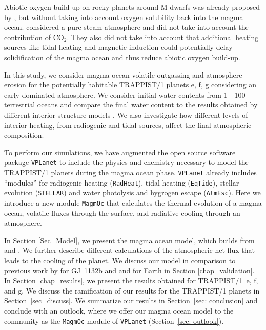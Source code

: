 \documentclass[paper=letterpaper,fontsize=12pt,oneside,twocolumn]{article}
\newcommand{\vplanet}{\texttt{\footnotesize{VPLanet}}}
\newcommand{\atmesc}{\texttt{\footnotesize{AtmEsc}}}
\newcommand{\eqtide}{\texttt{\footnotesize{EqTide}}}
\newcommand{\radheat}{\texttt{\footnotesize{RadHeat}}}
\newcommand{\stellar}{\texttt{\footnotesize{STELLAR}}}
\newcommand{\magmoc}{\texttt{\footnotesize{MagmOc}}}
\newcommand{\eg}{e.g. }
\begin{document}
Abiotic oxygen build-up on rocky planets around M dwarfs was already proposed by \citet{Luger2015a}, but without taking into account oxygen solubility back into the magma ocean.  considered a pure steam atmosphere and did not take into account the contribution of $\mathrm{CO_2}$. They also did not take into account that additional heating sources like tidal heating \citep[\eg][]{Driscoll2015} and magnetic induction \citep{Kislyakova2017} could potentially delay solidification of the magma ocean and thus reduce abiotic oxygen build-up.

In this study, we consider magma ocean volatile outgassing and atmosphere erosion for the potentially habitable \mbox{TRAPPIST\=/1} planets e, f, g considering an early  dominated atmosphere. We consider initial water contents from 1 - 100 terrestrial oceans and compare the final water content to the results obtained by different interior structure models \citep{Noack2016,barr2018interior,Dorn2018,Unterborn2018b}. We also investigate how different levels of interior heating, from radiogenic and tidal sources, affect the final atmospheric composition.

To perform our simulations, we have augmented the open source software package \vplanet{} \citep{Barnes2020} to include the physics and chemistry necessary to model the TRAPPIST\=/1 planets during the magma ocean phase. \vplanet{} already includes ``modules'' for radiogenic heating (\radheat{}), tidal heating (\eqtide{}), stellar evolution (\stellar{}) and water photolysis and hygrogen escape (\atmesc{}). Here we introduce a new module \magmoc{} that calculates the thermal evolution of a magma ocean, volatile fluxes through the surface, and radiative cooling through an  atmosphere.

In Section \ref{Sec_Model}, we present the magma ocean model, which builds from \citet{Schaefer2016} and \citet{Elkins-Tanton2008}. We further describe different calculations of the atmospheric net flux that leads to the cooling of the planet. 
We discuss our model in comparison to previous work by \citet{Schaefer2016} for GJ~1132b and \citet{Elkins-Tanton2008} and \citet{Hamano2013} for Earth in Section \ref{chap_validation}.
In Section \ref{chap_results}, we present the results obtained for TRAPPIST\=/1~e, f, and g. We discuss the ramification of our results for the TRAPPIST\=/1 planets in Section~\ref{sec_discuss}.
We summarize our results in Section~\ref{sec: conclusion} and conclude with an outlook, where we offer our magma ocean model to the community as the \magmoc{} module of \vplanet{}  (Section~\ref{sec: outlook}).
\end{document}
